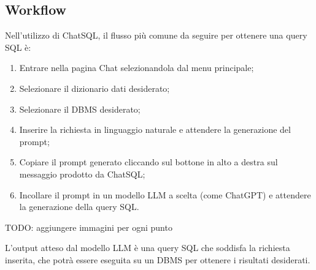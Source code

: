 \subsection{Workflow}
\par Nell'utilizzo di ChatSQL, il flusso più comune da seguire per ottenere una query SQL è:
\begin{enumerate}
  \item Entrare nella pagina Chat selezionandola dal menu principale;
  \item Selezionare il dizionario dati desiderato;
  \item Selezionare il DBMS desiderato;
  \item Inserire la richiesta in linguaggio naturale e attendere la generazione del prompt;
  \item Copiare il prompt generato cliccando sul bottone in alto a destra sul messaggio prodotto da ChatSQL;
  \item Incollare il prompt in un modello LLM a scelta (come ChatGPT) e attendere la generazione della query SQL.
\end{enumerate}
TODO: aggiungere immagini per ogni punto
\par L'output atteso dal modello LLM è una query SQL che soddisfa la richiesta inserita, che potrà essere eseguita su un DBMS per ottenere i risultati desiderati.